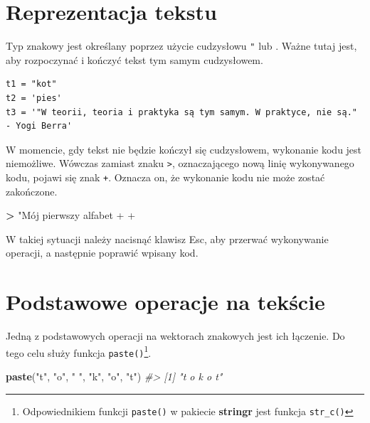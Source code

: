 \documentclass[paper=6in:9in,pagesize=pdftex,headinclude=on,footinclude=on,10pt]{scrbook}
\newenvironment{Shaded}{\begin{snugshade}}{\end{snugshade}}
\newcommand{\CommentTok}[1]{\textcolor[rgb]{0.56,0.35,0.01}{\textit{#1}}}
\newcommand{\KeywordTok}[1]{\textcolor[rgb]{0.13,0.29,0.53}{\textbf{#1}}}
\newcommand{\NormalTok}[1]{#1}
\newcommand{\OperatorTok}[1]{\textcolor[rgb]{0.81,0.36,0.00}{\textbf{#1}}}
\newcommand{\StringTok}[1]{\textcolor[rgb]{0.31,0.60,0.02}{#1}}
\begin{document}
\hypertarget{reprezentacja-tekstu}{%
\section{Reprezentacja tekstu}\label{reprezentacja-tekstu}}

Typ znakowy jest określany poprzez użycie cudzysłowu \texttt{"} lub \texttt{\textquotesingle{}}.
Ważne tutaj jest, aby rozpoczynać i kończyć tekst tym samym cudzysłowem.

\begin{verbatim}
t1 = "kot"
t2 = 'pies'
t3 = '"W teorii, teoria i praktyka są tym samym. W praktyce, nie są." - Yogi Berra'
\end{verbatim}

W momencie, gdy tekst nie będzie kończył się cudzysłowem, wykonanie kodu jest niemożliwe.
Wówczas zamiast znaku \texttt{\textgreater{}}, oznaczającego nową linię wykonywanego kodu, pojawi się znak \texttt{+}.
Oznacza on, że wykonanie kodu nie może zostać zakończone.

\begin{Shaded}
\begin{Highlighting}[]
\OperatorTok{>}\StringTok{ "Mój pierwszy alfabet}
\StringTok{+}
\StringTok{+}
\end{Highlighting}
\end{Shaded}

W takiej sytuacji należy nacisnąć klawisz Esc, aby przerwać wykonywanie operacji, a następnie poprawić wpisany kod.

\hypertarget{podstawowe-operacje-na-tekscie}{%
\section{Podstawowe operacje na tekście}\label{podstawowe-operacje-na-tekscie}}

Jedną z podstawowych operacji na wektorach znakowych jest ich łączenie.
Do tego celu służy funkcja \texttt{paste()}\footnote{Odpowiednikiem funkcji \texttt{paste()} w pakiecie \textbf{stringr} jest funkcja \texttt{str\_c()}}.

\begin{Shaded}
\begin{Highlighting}[]
\KeywordTok{paste}\NormalTok{(}\StringTok{"t"}\NormalTok{, }\StringTok{"o"}\NormalTok{, }\StringTok{" "}\NormalTok{, }\StringTok{"k"}\NormalTok{, }\StringTok{"o"}\NormalTok{, }\StringTok{"t"}\NormalTok{)}
\CommentTok{#> [1] "t o   k o t"}
\end{Highlighting}
\end{Shaded}
\end{document}
